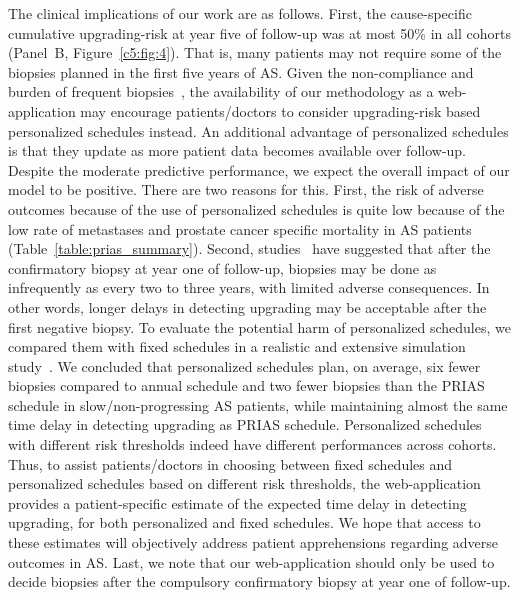 The clinical implications of our work are as follows. First, the cause-specific cumulative upgrading-risk at year five of follow-up was at most 50\% in all cohorts (Panel~B, Figure~\ref{c5:fig:4}). That is, many patients may not require some of the biopsies planned in the first five years of AS. Given the non-compliance and burden of frequent biopsies~\citep{bokhorst2015compliance}, the availability of our methodology as a web-application may encourage patients/doctors to consider upgrading-risk based personalized schedules instead. An additional advantage of personalized schedules is that they update as more patient data becomes available over follow-up. Despite the moderate predictive performance, we expect the overall impact of our model to be positive. There are two reasons for this. First, the risk of adverse outcomes because of the use of personalized schedules is quite low because of the low rate of metastases and prostate cancer specific mortality in AS patients (Table~\ref{table:prias_summary}). Second, studies~\citep{carvalho2017,inoue2018comparative} have suggested that after the confirmatory biopsy at year one of follow-up, biopsies may be done as infrequently as every two to three years, with limited adverse consequences. In other words, longer delays in detecting upgrading may be acceptable after the first negative biopsy. To evaluate the potential harm of personalized schedules, we compared them with fixed schedules in a realistic and extensive simulation study~\citep{tomer2019personalized}. We concluded that personalized schedules plan, on average, six fewer biopsies compared to annual schedule and two fewer biopsies than the PRIAS schedule in slow/non-progressing AS patients, while maintaining almost the same time delay in detecting upgrading as PRIAS schedule. Personalized schedules with different risk thresholds indeed have different performances across cohorts. Thus, to assist patients/doctors in choosing between fixed schedules and personalized schedules based on different risk thresholds, the web-application provides a patient-specific estimate of the expected time delay in detecting upgrading, for both personalized and fixed schedules. We hope that access to these estimates will objectively address patient apprehensions regarding adverse outcomes in AS. Last, we note that our web-application should only be used to decide biopsies after the compulsory confirmatory biopsy at year one of follow-up.

